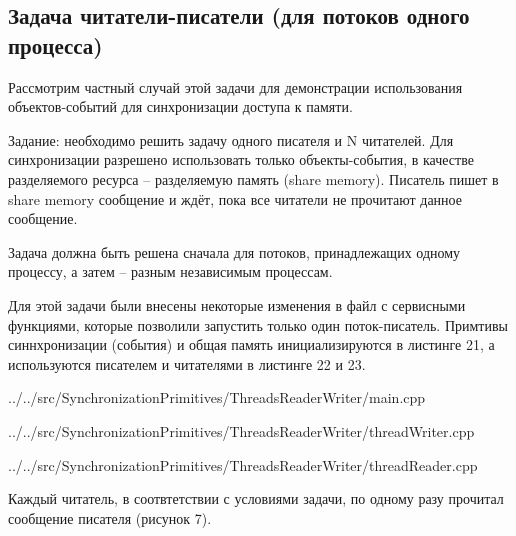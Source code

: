 \documentclass[a4paper, 12pt]{article}		%
\begin{document}
\newpage
\subsection{Задача читатели-писатели (для потоков одного процесса)}

Рассмотрим частный случай этой задачи для демонстрации использования объектов-событий для синхронизации доступа к памяти.

Задание: необходимо решить задачу одного писателя и N читателей. Для синхронизации разрешено использовать только объекты-события, в качестве разделяемого ресурса -- разделяемую память (share memory). Писатель пишет в share memory сообщение и ждёт, пока все читатели не прочитают данное сообщение.

Задача должна быть решена сначала для потоков, принадлежащих одному процессу, а затем – разным независимым процессам.

Для этой задачи были внесены некоторые изменения в файл с сервисными функциями, которые позволили запустить только один поток-писатель. Примтивы синнхронизации (события) и общая память инициализируются в листинге 21, а используются писателем и читателями в листинге 22 и 23.


{../../src/SynchronizationPrimitives/ThreadsReaderWriter/main.cpp}


{../../src/SynchronizationPrimitives/ThreadsReaderWriter/threadWriter.cpp}


{../../src/SynchronizationPrimitives/ThreadsReaderWriter/threadReader.cpp}
\newpage

Каждый читатель, в соотвтетствии с условиями задачи, по одному разу прочитал сообщение писателя (рисунок 7).
\end{document}
